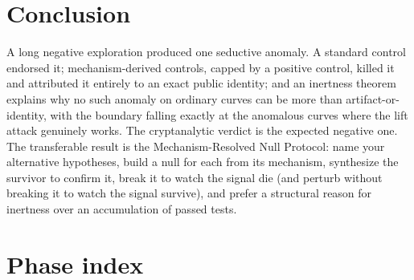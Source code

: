\documentclass[11pt]{article}
\theoremstyle{definition}
\begin{document}
\section{Conclusion}

A long negative exploration produced one seductive anomaly. A standard
control endorsed it; mechanism-derived controls, capped by a positive
control, killed it and attributed it entirely to an exact public
identity; and an inertness theorem explains why no such anomaly on
ordinary curves can be more than artifact-or-identity, with the boundary
falling exactly at the anomalous curves where the lift attack genuinely
works. The cryptanalytic verdict is the expected negative one. The
transferable result is the Mechanism-Resolved Null Protocol: name your
alternative hypotheses, build a null for each from its mechanism,
synthesize the survivor to confirm it, break it to watch the signal die
(and perturb without breaking it to watch the signal survive), and
prefer a structural reason for inertness over an accumulation of passed
tests.

\appendix
\section{Phase index}\label{app:phases}
\end{document}
